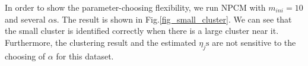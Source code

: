 \documentclass[journal]{IEEEtran}
\theoremstyle{definition}
\begin{document}
In order to show the parameter-choosing flexibility, we run NPCM with $m_{ini}=10$ and several $\alpha\text{s}$. The result is shown in Fig.\ref{fig_small_cluster}.
We can see that the small cluster is identified correctly when there is a large cluster near it. Furthermore, the clustering result and the estimated $\eta_j\text{s}$ are not sensitive to the choosing of $\alpha$ for this dataset. 
\begin{figure}[tb]
\captionsetup[subfloat]{farskip=1pt,captionskip=1pt}%
   \centering
   \quad
    \\
    \subfloat[]

\end{figure}
\end{document}
